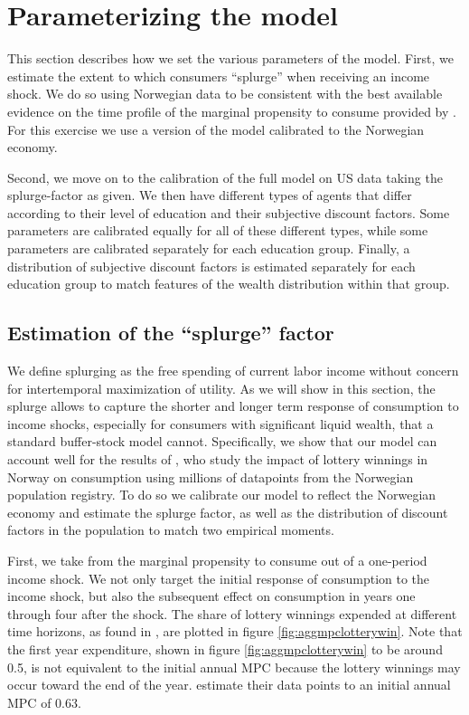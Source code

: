 \documentclass[../HAFiscal]{subfiles}
\begin{document}
\section{Parameterizing the model}

This section describes how we set the various parameters of the model. First, we estimate the extent to which consumers ``splurge'' when receiving an income shock. We do so using Norwegian data to be consistent with the best available evidence on the time profile of the marginal propensity to consume provided by \citet{fagereng_mpc_2021}. For this exercise we use a version of the model calibrated to the Norwegian economy. 

Second, we move on to the calibration of the full model on US data taking the splurge-factor as given. We then have different types of agents that differ according to their level of education and their subjective discount factors. Some parameters are calibrated equally for all of these different types, while some parameters are calibrated separately for each education group. Finally, a distribution of subjective discount factors is estimated separately for each education group to match features of the wealth distribution within that group. 

\subsection{Estimation of the ``splurge'' factor}
\label{sec:splurge}

We define splurging as the free spending of current labor income without concern for intertemporal maximization of utility. As we will show in this section, the splurge allows to capture the shorter and longer term response of consumption to income shocks, especially for consumers with significant liquid wealth, that a standard buffer-stock model cannot. Specifically, we show that our model can account well for the results of \citet{fagereng_mpc_2021}, who study the impact of lottery winnings in Norway on consumption using millions of datapoints from the Norwegian population registry. To do so we calibrate our model to reflect the Norwegian economy and estimate the splurge factor, as well as the distribution of discount factors in the population to match two empirical moments. 

First, we take from \citet{fagereng_mpc_2021} the marginal propensity to consume out of a one-period income shock. We not only target the initial response of consumption to the income shock, but also the subsequent effect on consumption in years one through four after the shock. The share of lottery winnings expended at different time horizons, as found in \citet{fagereng_mpc_2021}, are plotted in figure \ref{fig:aggmpclotterywin}. Note that the first year expenditure, shown in figure \ref{fig:aggmpclotterywin} to be around 0.5, is not equivalent to the initial annual MPC because the lottery winnings may occur toward the end of the year. \citet{fagereng_mpc_2021} estimate their data points to an initial annual MPC of 0.63.
\end{document}
